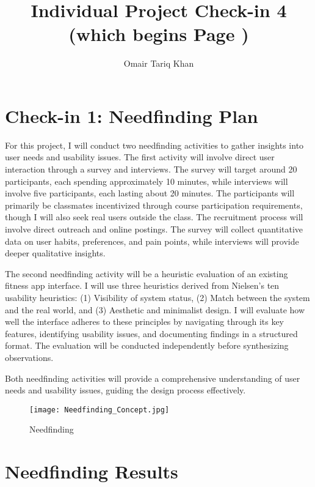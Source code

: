 \documentclass[
	letterpaper, %
]{jdf}
\author{Omair Tariq Khan}
\title{Individual Project Check-in 4 (which begins Page )}
\begin{document}

\maketitle
\hfill \break

\section{Check-in 1: Needfinding Plan}
For this project, I will conduct two needfinding activities to gather insights into user needs and usability issues. The first activity will involve direct user interaction through a survey and interviews. The survey will target around 20 participants, each spending approximately 10 minutes, while interviews will involve five participants, each lasting about 20 minutes. The participants will primarily be classmates incentivized through course participation requirements, though I will also seek real users outside the class. The recruitment process will involve direct outreach and online postings. The survey will collect quantitative data on user habits, preferences, and pain points, while interviews will provide deeper qualitative insights.

The second needfinding activity will be a heuristic evaluation of an existing fitness app interface. I will use three heuristics derived from Nielsen’s ten usability heuristics: (1) Visibility of system status, (2) Match between the system and the real world, and (3) Aesthetic and minimalist design. I will evaluate how well the interface adheres to these principles by navigating through its key features, identifying usability issues, and documenting findings in a structured format. The evaluation will be conducted independently before synthesizing observations.

Both needfinding activities will provide a comprehensive understanding of user needs and usability issues, guiding the design process effectively.

\begin{figure}
    \centering
    \texttt{[image: Needfinding\_Concept.jpg]}
    \caption{Needfinding}
    \label{fig:enter-label}
\end{figure}

\newpage

\section{Needfinding Results }
\end{document}

